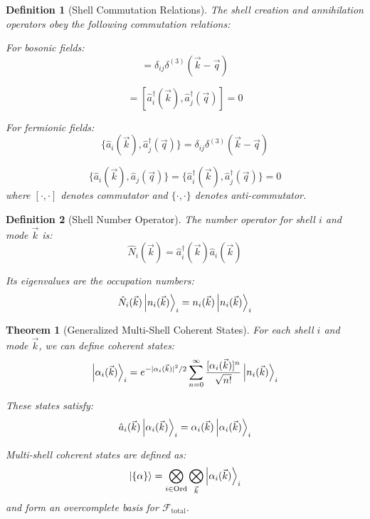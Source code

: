 \documentclass[12pt,a4paper]{article}
\newtheorem{theorem}{Theorem}[section]
\newtheorem{definition}{Definition}[section]
\newcommand{\F}{\mathcal{F}}
\begin{document}
\begin{definition}[Shell Commutation Relations]
\label{def:commutation-relations}
The shell creation and annihilation operators obey the following commutation relations:

For bosonic fields:
\begin{equation}
[\hat{a}_i(\vec{k}), \hat{a}_j^{\dagger}(\vec{q})] = \delta_{ij} \delta^{(3)}(\vec{k} - \vec{q})
\end{equation}

\begin{equation}
[\hat{a}_i(\vec{k}), \hat{a}_j(\vec{q})] = [\hat{a}_i^{\dagger}(\vec{k}), \hat{a}_j^{\dagger}(\vec{q})] = 0
\end{equation}

For fermionic fields:
\begin{equation}
\{\hat{a}_i(\vec{k}), \hat{a}_j^{\dagger}(\vec{q})\} = \delta_{ij} \delta^{(3)}(\vec{k} - \vec{q})
\end{equation}

\begin{equation}
\{\hat{a}_i(\vec{k}), \hat{a}_j(\vec{q})\} = \{\hat{a}_i^{\dagger}(\vec{k}), \hat{a}_j^{\dagger}(\vec{q})\} = 0
\end{equation}
where $[\cdot,\cdot]$ denotes commutator and $\{\cdot,\cdot\}$ denotes anti-commutator.
\end{definition}

\begin{definition}[Shell Number Operator]
\label{def:number-operator}
The number operator for shell $i$ and mode $\vec{k}$ is:
\begin{equation}
\hat{N}_i(\vec{k}) = \hat{a}_i^{\dagger}(\vec{k}) \hat{a}_i(\vec{k})
\end{equation}

Its eigenvalues are the occupation numbers:
\begin{equation}
\hat{N}_i(\vec{k}) \ket{n_i(\vec{k})}_i = n_i(\vec{k}) \ket{n_i(\vec{k})}_i
\end{equation}
\end{definition}

\begin{theorem}[Generalized Multi-Shell Coherent States]
\label{thm:coherent-states}
For each shell $i$ and mode $\vec{k}$, we can define coherent states:
\begin{equation}
\ket{\alpha_i(\vec{k})}_i = e^{-|\alpha_i(\vec{k})|^2/2} \sum_{n=0}^{\infty} \frac{[\alpha_i(\vec{k})]^n}{\sqrt{n!}} \ket{n_i(\vec{k})}_i
\end{equation}

These states satisfy:
\begin{equation}
\hat{a}_i(\vec{k}) \ket{\alpha_i(\vec{k})}_i = \alpha_i(\vec{k}) \ket{\alpha_i(\vec{k})}_i
\end{equation}

Multi-shell coherent states are defined as:
\begin{equation}
\ket{\{\alpha\}} = \bigotimes_{i \in \text{Ord}} \bigotimes_{\vec{k}} \ket{\alpha_i(\vec{k})}_i
\end{equation}
and form an overcomplete basis for $\F_{\text{total}}$.
\end{theorem}
\end{document}
